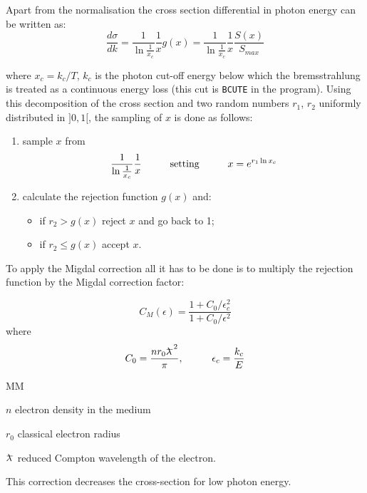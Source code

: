 Apart from the normalisation the cross section differential in photon
energy can be written as:
\[
\frac{d \sigma}{d k} = \frac{1}{\ln \frac{1}{x_{c}}} \frac{1}{x}
g(x) = \frac{1}{\ln \frac{1}{x_{c}}} \frac{1}{x} \frac{S(x)}{S_{max}}
\]
 
where $x_{c} = k_{c}/T$, $k_{c}$ is the photon cut-off energy below
which the bremsstrahlung is treated as a continuous energy loss
(this cut is {\tt BCUTE} in the program). Using this decomposition of
the cross section and two random numbers $r_{1}$, $r_{2}$ uniformly
distributed in $]0,1[$, the sampling of $x$ is done as follows:
\begin{enumerate}
\item sample $x$ from
\[
\frac{1}{\ln \frac{1}{x_{c}}} \frac{1}{x} \mbox{\hspace{1cm}setting\hspace{1cm}}
x = e^{r_{1} \ln x_{c}}
\]
 
\item calculate the rejection function $g(x)$ and:
\begin{itemize}
\item if $r_{2} > g(x)$ reject $x$ and go back to 1;
\item if $r_{2} \leq g(x)$ accept $x$.
\end{itemize}
\end{enumerate}
 
To apply the Migdal correction \cite{bib-MIGD} all it has to be done is to
multiply the rejection function by the Migdal correction
factor:
 
\[
C_M (\epsilon)  =\frac{1 + C_0 / \epsilon_c^2}
               {1 + C_0 / \epsilon^2} 
\]
 where
\[
C_0 =\frac{nr_0 \lambdar^2 }{\pi}, \hspace{1cm} \epsilon_c = \frac{k_{c}}{E}
\]
\begin{DLtt}{MM}
\item[$n$]           electron density in the medium
\item[$r_0$]         classical electron radius
\item[$\lambdar$]    reduced Compton wavelength of the electron.
\end{DLtt}
This correction decreases the cross-section for low photon energy.
 
